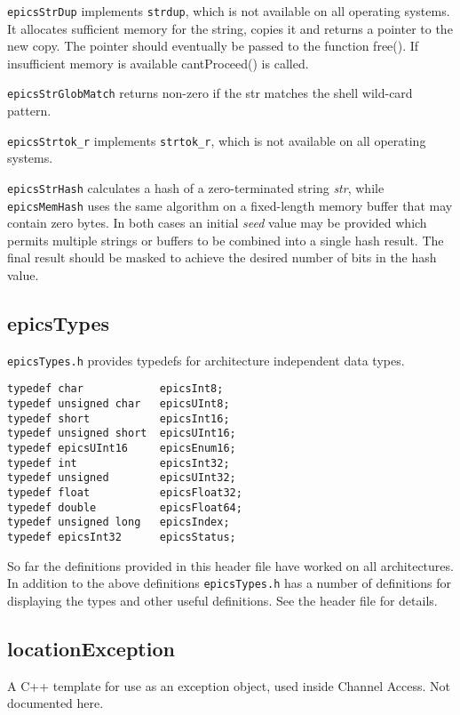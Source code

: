 \verb|epicsStrDup| implements \verb|strdup|, which is not available on all operating systems.
It allocates sufficient memory for the string, copies it and returns a pointer to the new copy.
The pointer should eventually be passed to the function free().
If insufficient memory is available cantProceed() is called.

\verb|epicsStrGlobMatch| returns non-zero if the str matches the shell wild-card pattern.

\verb|epicsStrtok_r| implements \verb|strtok_r|, which is not available on all operating systems.

\verb|epicsStrHash| calculates a hash of a zero-terminated string \emph{str}, while \verb|epicsMemHash| uses the same algorithm on a fixed-length memory buffer that may contain zero bytes.
In both cases an initial \emph{seed} value may be provided which permits multiple strings or buffers to be combined into a single hash result.
The final result should be masked to achieve the desired number of bits in the hash value.

\subsection{epicsTypes}

\verb|epicsTypes.h| provides typedefs for architecture independent data types.

\begin{verbatim}
typedef char            epicsInt8;
typedef unsigned char   epicsUInt8;
typedef short           epicsInt16;
typedef unsigned short  epicsUInt16;
typedef epicsUInt16     epicsEnum16;
typedef int             epicsInt32;
typedef unsigned        epicsUInt32;
typedef float           epicsFloat32;
typedef double          epicsFloat64;
typedef unsigned long   epicsIndex;
typedef epicsInt32      epicsStatus;
\end{verbatim}

So far the definitions provided in this header file have worked on all architectures.
In addition to the above definitions \verb|epicsTypes.h| has a number of definitions for displaying the types and other useful definitions.
See the header file for details.

\subsection{locationException}

A C++ template for use as an exception object, used inside Channel Access.
Not documented here.

